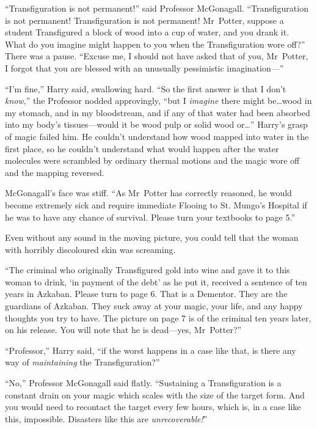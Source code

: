 “Transfiguration is not permanent!” said Professor McGonagall. “Transfiguration is not permanent! Transfiguration is not permanent! Mr~Potter, suppose a student Transfigured a block of wood into a cup of water, and you drank it. What do you imagine might happen to you when the Transfiguration wore off?” There was a pause. “Excuse me, I should not have asked that of you, Mr~Potter, I forgot that you are blessed with an unusually pessimistic imagination—”

“I’m fine,” Harry said, swallowing hard. “So the first answer is that I don’t \emph{know},” the Professor nodded approvingly, “but I \emph{imagine} there might be…wood in my stomach, and in my bloodstream, and if any of that water had been absorbed into my body’s tissues—would it be wood pulp or solid wood or…” Harry’s grasp of magic failed him. He couldn’t understand how wood mapped into water in the first place, so he couldn’t understand what would happen after the water molecules were scrambled by ordinary thermal motions and the magic wore off and the mapping reversed.

McGonagall’s face was stiff. “As Mr~Potter has correctly reasoned, he would become extremely sick and require immediate Flooing to St. Mungo’s Hospital if he was to have any chance of survival. Please turn your textbooks to page 5.”

Even without any sound in the moving picture, you could tell that the woman with horribly discoloured skin was screaming.

“The criminal who originally Transfigured gold into wine and gave it to this woman to drink, ‘in payment of the debt’ as he put it, received a sentence of ten years in Azkaban. Please turn to page 6. That is a Dementor. They are the guardians of Azkaban. They suck away at your magic, your life, and any happy thoughts you try to have. The picture on page 7 is of the criminal ten years later, on his release. You will note that he is dead—yes, Mr~Potter?”

“Professor,” Harry said, “if the worst happens in a case like that, is there any way of \emph{maintaining} the Transfiguration?”

“No,” Professor McGonagall said flatly. “Sustaining a Transfiguration is a constant drain on your magic which scales with the size of the target form. And you would need to recontact the target every few hours, which is, in a case like this, impossible. Disasters like this are \emph{unrecoverable!}”

